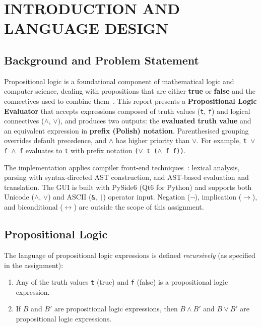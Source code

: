 \chapter{INTRODUCTION AND LANGUAGE DESIGN}

\section{Background and Problem Statement}

Propositional logic is a foundational component of mathematical logic and computer science, dealing with propositions that are either \textbf{true} or \textbf{false} and the connectives used to combine them~\citep{ben2012mathematical}. This report presents a \textbf{Propositional Logic Evaluator} that accepts expressions composed of truth values (\texttt{t}, \texttt{f}) and logical connectives ($\wedge$, $\vee$), and produces two outputs: the \textbf{evaluated truth value} and an equivalent expression in \textbf{prefix (Polish) notation}. Parenthesised grouping overrides default precedence, and $\wedge$ has higher priority than $\vee$. For example, \texttt{t $\vee$ f $\wedge$ f} evaluates to \texttt{t} with prefix notation \texttt{($\vee$ t ($\wedge$ f f))}.

The implementation applies compiler front-end techniques~\citep{aho2006compilers}: lexical analysis, parsing with syntax-directed AST construction, and AST-based evaluation and translation. The GUI is built with PySide6 (Qt6 for Python) and supports both Unicode ($\wedge$, $\vee$) and ASCII (\texttt{\&}, \texttt{|}) operator input. Negation ($\neg$), implication ($\rightarrow$), and biconditional ($\leftrightarrow$) are outside the scope of this assignment.

\section{Propositional Logic}

The language of propositional logic expressions is defined \emph{recursively} (as specified in the assignment):

\begin{enumerate}
    \item Any of the truth values \texttt{t} (true) and \texttt{f} (false) is a propositional logic expression.
    \item If $B$ and $B'$ are propositional logic expressions, then $B \wedge B'$ and $B \vee B'$ are propositional logic expressions.
\end{enumerate}

